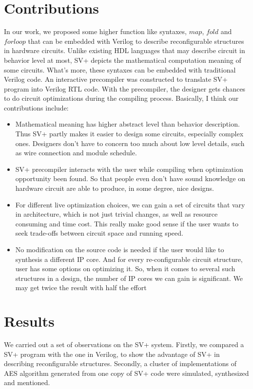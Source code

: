 \documentclass{acm_proc_article-sp}
\begin{document}
\section{Contributions}
In our work, we proposed some higher function\cite{highorderfunction} like syntaxes, $map$, $fold$ and $forloop$ that can be embedded with Verilog to describe reconfigurable structures in hardware circuits. Unlike existing HDL languages that may describe circuit in behavior level at most, SV+ depicts the mathematical computation meaning of some circuits. What's more, these syntaxes can be embedded with traditional Verilog code. An interactive precompiler was constructed to translate SV+ program into Verilog RTL code. With the precompiler, the designer gets chances to do circuit optimizations during the compiling process. Basically, I think our contributions include:
\vspace{-4ex}
\begin{itemize}\itemsep2pt \parskip0pt 
\item Mathematical meaning has higher abstract level than behavior description. 
Thus SV+ partly makes it easier to design some circuits, especially 
complex ones. Designers don't have to concern too much about low level details, such as 
wire connection and module schedule.
\item SV+ precompiler interacts with the user while compiling when optimization opportunity
been found. So that people even don't have sound knowledge on hardware circuit are 
able to produce, in some degree, nice designs. 
\item For different live optimization choices, we can gain a set of circuits that vary in 
architecture, which is not just trivial changes, as well as resource consuming and 
time cost. This really make good sense if the user wants to seek trade-offs between 
circuit space and running speed. 
\item No modification on the source code is needed if the user would like to synthesis a
different IP core. And for every re-configurable circuit structure, user has some 
options on optimizing it. So, when it comes to several such structures in a design, the 
number 
of IP cores we can gain is significant. We may get twice the result with half the effort
\end{itemize}
\section{Results}
We carried out a set of observations on the SV+ system. Firstly, we compared a SV+ program with the one in Verilog, to show the advantage of SV+ in describing reconfigurable structures. Secondly, a cluster of implementations of AES algorithm generated from one copy of SV+ code were simulated, synthesized and mentioned.
\end{document}
